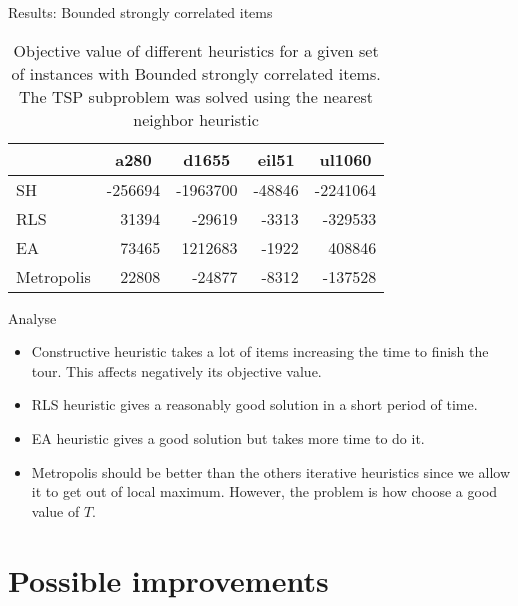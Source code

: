 \documentclass[newPxFont]{beamer}
\begin{document}
\begin{frame}{Results: Bounded strongly correlated items}
\vspace{-2em}
\begin{table}[]
	\caption{Objective value of different heuristics for a given set of instances with Bounded strongly correlated
	items. The TSP subproblem was solved using the nearest neighbor	heuristic}
	\begin{tabular}[]{lrrrr}
		\toprule
		\textbf{}			& \multicolumn{1}{c}{\textbf{a280}}
		                    & \multicolumn{1}{c}{\textbf{d1655}}
		                    & \multicolumn{1}{c}{\textbf{eil51}}
		                    & \multicolumn{1}{c}{\textbf{ul1060}} \\
		\midrule                                           
		SH				& -256694 & -1963700 & -48846 & -2241064	\\[0.25em]
		RLS				& 31394 & -29619 & -3313 & -329533	    \\[0.25em]
		EA				& 73465	& 1212683 & -1922 & 408846   	\\[0.25em]
		Metropolis		& 22808	& -24877 & -8312 & -137528	\\
		\bottomrule
	\end{tabular}
	\label{tab:WindowFunctions}
\end{table}
\end{frame}

\begin{frame}{Analyse}
\vspace{-2em}
\begin{itemize}
\item Constructive heuristic takes a lot of items increasing the time to finish the tour. This affects negatively its objective value.
\item RLS heuristic gives a reasonably good solution in a short period of time.
\item EA heuristic gives a good solution but takes more time to do it.
\item Metropolis should be better than the others iterative heuristics since we allow it to get out of local maximum. However, the problem is how choose a good value of $T$.
\end{itemize}
\end{frame}

\section{\textup{Possible improvements}}
\end{document}
